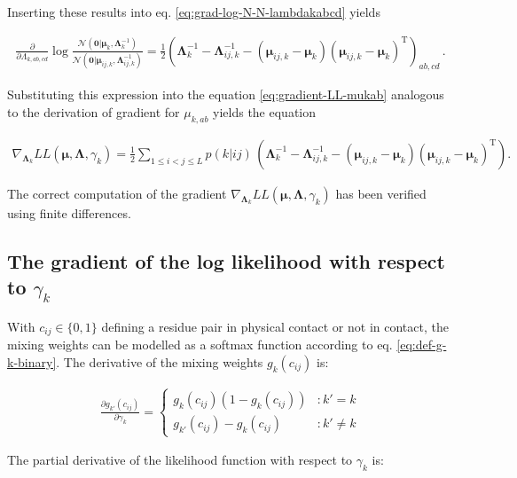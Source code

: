 \documentclass[11pt,a4paper,twoside]{book}
\newcommand{\Gauss}{\mathcal{N}}
\newcommand{\Lijk}{\mathbf{\Lambda}_{ij,k}}
\newcommand{\Lk}{\mathbf{\Lambda}_k}
\newcommand{\muijk}{\mathbf{\mu}_{ij,k}}
\newcommand{\muk}{\mathbf{\mu}_k}
\newcommand{\cij}{c_{ij}}
\theoremstyle{definition}
\theoremstyle{definition}
\theoremstyle{remark}
\begin{document}
Inserting these results into eq. \eqref{eq:grad-log-N-N-lambdakabcd}
yields

\begin{align}
     \frac{\partial}{\partial \Lambda_{k,ab,cd}} \log \frac{  \Gauss(\mathbf{0} | \muk, \Lk^{-1})}{\Gauss( \mathbf{0} | \muijk, \Lijk^{-1})} 
    = \frac{1}{2} \left( \Lk^{-1} - \Lijk^{-1} - (\muijk - \muk) (\muijk - \muk)^\mathrm{T} \right)_{ab,cd}\,.
\end{align}

Substituting this expression into the equation
\eqref{eq:gradient-LL-mukab} analogous to the derivation of gradient for
\(\mu_{k,ab}\) yields the equation

\begin{align}
    \nabla_{\Lk}  L\!L(\mathbf{\mu}, \mathbf{\Lambda}, \gamma_k)
    =  \frac{1}{2} \sum_{1\le i<j\le L}  p(k|ij)  \, 
        \left( \Lk^{-1} - \Lijk^{-1} - (\muijk - \muk) (\muijk - \muk)^\mathrm{T} \right). 
\label{eq:gradient-lambdak-final}
\end{align}

The correct computation of the gradient
\(\nabla_{\Lk} L\!L(\mathbf{\mu}, \mathbf{\Lambda}, \gamma_k)\) has been
verified using finite differences.

\subsection{\texorpdfstring{The gradient of the log likelihood with
respect to
\(\gamma_k\)}{The gradient of the log likelihood with respect to \textbackslash{}gamma\_k}}\label{the-gradient-of-the-log-likelihood-with-respect-to-gamma_k}

With \(\cij \in \{0,1\}\) defining a residue pair in physical contact or
not in contact, the mixing weights can be modelled as a softmax function
according to eq. \eqref{eq:def-g-k-binary}. The derivative of the mixing
weights \(g_k(\cij)\) is:

\begin{eqnarray}
\frac{\partial g_{k'}(\cij)} {\partial \gamma_k} = \left\{
  \begin{array}{lr}
    g_k(\cij) (1 - g_k(\cij)) & : k' = k\\
    g_{k'}(\cij) - g_k(\cij)  & : k' \neq k
  \end{array}
  \right.
\end{eqnarray}

The partial derivative of the likelihood function with respect to
\(\gamma_k\) is:
\end{document}
